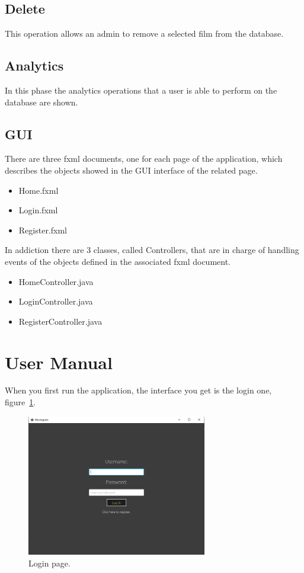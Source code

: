 \documentclass[a4paper, oneside]{article}
\begin{document}
\subsection{Delete}
This operation allows an admin to remove a selected film from the database.
\vspace{2mm}

\vspace{5mm}

\clearpage

\subsection{Analytics}
In this phase the analytics operations that a user is able to perform on the database are shown.

\subsection{GUI}
There are three fxml documents, one for each page of the application, which describes the objects showed in the GUI interface of the related page.
\begin{itemize}
\item Home.fxml
\item Login.fxml
\item Register.fxml
\end{itemize}
In addiction there are 3 classes, called Controllers, that are in charge of handling events of the objects defined in the associated fxml document.
\begin{itemize}
\item HomeController.java
\item LoginController.java
\item RegisterController.java
\end{itemize}

\clearpage
\section{User Manual}
When you first run the application, the interface you get is the login one, figure~\ref{fig:screen0}.
\begin{figure}[H]
\centering
\includegraphics[width=0.7\textwidth]{./images/screens/screen0} 
\caption{Login page.}
\label{fig:screen0}
\end{figure}
\end{document}
